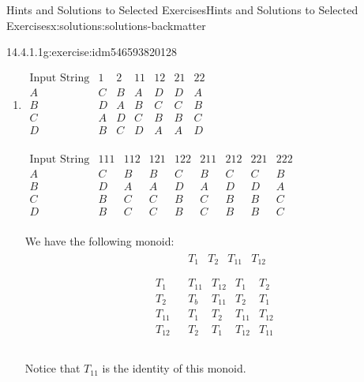 \documentclass[oneside,10pt,]{book}
\numberwithin{equation}{section}
\begin{document}
\begin{solutions-chapter}{Hints and Solutions to Selected Exercises}{}{Hints and Solutions to Selected Exercises}{}{}{x:solutions:solutions-backmatter}
\begin{divisionsolution}{14.4.1.1}{}{g:exercise:idm546593820128}
\begin{enumerate}[label=(\alph*)]
\item{}\(\begin{array}{c|cccccc}
\textrm{Input String} & 1 & 2  &  11 & 12 & 21 & 22 \\
\hline
A & C & B & A & D & D & A \\
B &  D & A & B & C & C & B \\
C & A & D & C & B & B & C \\
D &  B & C & D & A & A & D \\
\end{array}\)%
\par
\(\begin{array}{c|cccccccc}
\textrm{Input String} &111 & 112 & 121 & 122 & 211 & 212 & 221 & 222 \\
\hline
A & C & B & B & C & B & C & C & B \\
B  & D & A & A &  D & A & D & D & A \\
C  & B & C & C & B & C & B & B & C \\
D  & B & C & C & B & C & B & B & C \\
\end{array}\)%
\par
We have the following monoid:%
\begin{equation*}
\begin{array}{c|c}
& 
\begin{array}{cccc}
T_1 &  T_2 & T_{11} &  T_{12} \\
\end{array}
\\
\hline
\begin{array}{c}
T_1 \\
T_2 \\
T_{11} \\
T_{12} \\
\end{array}
& 
\begin{array}{cccc}
T_{11} & T_{12} & T_1 & T_2 \\
T_b & T_{11} & T_2 & T_1 \\
T_1 & T_2 & T_{11} & T_{12} \\
T_2 & T_1 & T_{12} & T_{11} \\
\end{array}
\\
\end{array}
\end{equation*}
%
\par
Notice that \(T_{11}\) is the identity of this monoid.%
\end{enumerate}
%
\end{divisionsolution}%

\end{solutions-chapter}
\end{document}
